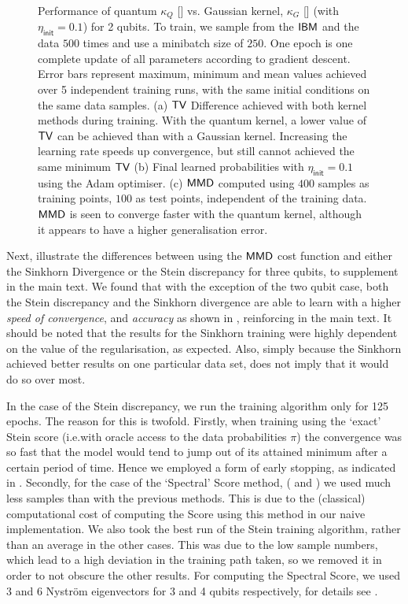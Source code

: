 \begin{figure}
    \caption{Performance of quantum $\kappa_Q$ [\crule[red]{0.2cm}{0.2cm}] vs. Gaussian kernel,  $\kappa_G$ [\crule[blue]{0.2cm}{0.2cm}] (with $\eta_{\mathsf{init}} = 0.1$) for 2 qubits. To train, we sample from the $\textsf{IBM}$ and the data $500$ times and use a minibatch size of $250$. One epoch is one complete update of all parameters according to gradient descent. Error bars represent maximum, minimum and mean values achieved over 5 independent training runs, with the same initial conditions on the same data samples. (a) $\operatorname{\textsf{TV}}$ Difference achieved with both kernel methods during training. With the quantum kernel, a lower value of $\operatorname{\textsf{TV}}$ can be achieved than with a Gaussian kernel. Increasing the learning rate speeds up convergence, but still cannot achieved the same minimum $\operatorname{\textsf{TV}}$ (b) Final learned probabilities with $\eta_{\mathsf{init}} = 0.1$ using the Adam optimiser. (c) $\operatorname{\textsf{MMD}}$ computed using $400$ samples as training points, $100$ as test points, independent of the training data. $\operatorname{\textsf{MMD}}$ is seen to converge faster with the quantum kernel, although it appears to have a higher generalisation error.}
    \label{fig:QvGkernel2}
\end{figure}


Next,  illustrate the differences between using the $\operatorname{\textsf{MMD}}$ cost function and either the Sinkhorn Divergence or the Stein discrepancy for three qubits, to supplement  in the main text. We found that with the exception of the two qubit case, both the Stein discrepancy and the Sinkhorn divergence are able to learn with a higher \textit{speed of convergence}, and \textit{accuracy} as shown in , reinforcing  in the main text. It should be noted that the results for the Sinkhorn training were highly dependent on the value of the regularisation, as expected. Also, simply because the Sinkhorn achieved better results on one particular data set, does not imply that it would do so over most. 

In the case of the Stein discrepancy, we run the training algorithm only for 125 epochs. The reason for this is twofold. Firstly, when training using the `exact' Stein score (i.e.\@ with oracle access to the data probabilities $\pi$) the convergence was so fast that the model would tend to jump out of its attained minimum after a certain period of time. Hence we employed a form of early stopping, as indicated in . Secondly, for the case of the `Spectral' Score method, ( and ) we used much less samples than with the previous methods. This is due to the (classical) computational cost of computing the Score using this method in our naive implementation. We also took the best run of the Stein training algorithm, rather than an average in the other cases. This was due to the low sample numbers, which lead to a high deviation in the training path taken, so we removed it in order to not obscure the other results. For computing the Spectral Score, we used 3 and 6 Nystr{\"o}m eigenvectors for 3 and 4 qubits respectively, for details see . 

